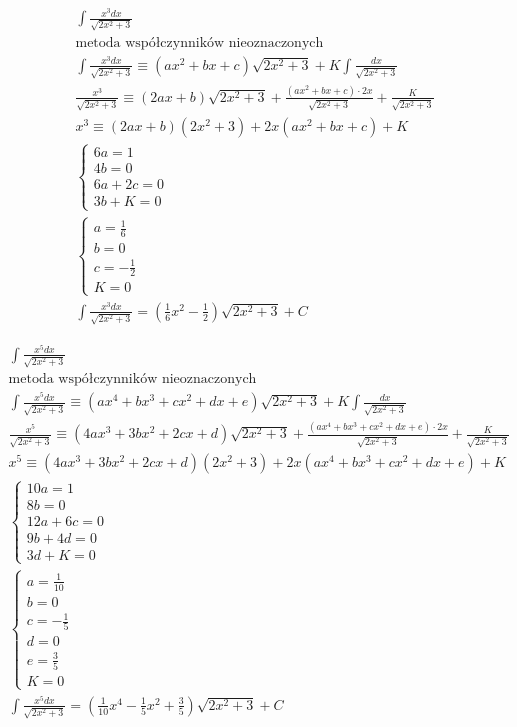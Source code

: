 \begin{gather*}
  \int \frac{x^3dx}{\sqrt{2x^2+3}} \\
  \text{metoda współczynników nieoznaczonych} \\
  \int \frac{x^3dx}{\sqrt{2x^2+3}} \equiv (ax^2+bx+c)\sqrt{2x^2+3} + K\int \frac{dx}{\sqrt{2x^2+3}} \\
\frac{x^3}{\sqrt{2x^2+3}} \equiv (2ax+b)\sqrt{2x^2+3} + \frac{(ax^2+bx+c)\cdot 2x}{\sqrt{2x^2+3}} + \frac{K}{\sqrt{2x^2+3}} \\
x^3 \equiv (2ax+b)(2x^2+3)+2x(ax^2+bx+c)+K \\
\begin{cases} 6a=1 \\ 4b=0 \\ 6a+2c=0 \\ 3b+K=0 \end{cases} \\
\begin{cases} a=\frac{1}{6} \\ b=0 \\ c=-\frac{1}{2} \\ K=0 \end{cases} \\
\int \frac{x^3dx}{\sqrt{2x^2+3}} = (\frac{1}{6}x^2-\frac{1}{2})\sqrt{2x^2+3}+C\end{gather*}



\begin{gather*}
  \int \frac{x^5dx}{\sqrt{2x^2+3}} \\
  \text{metoda współczynników nieoznaczonych} \\
  \int \frac{x^5dx}{\sqrt{2x^2+3}} \equiv (ax^4+bx^3+cx^2+dx+e)\sqrt{2x^2+3}+K\int \frac{dx}{\sqrt{2x^2+3}} \\
\frac{x^5}{\sqrt{2x^2+3}} \equiv (4ax^3+3bx^2+2cx+d)\sqrt{2x^2+3}+\frac{(ax^4+bx^3+cx^2+dx+e)\cdot 2x}{\sqrt{2x^2+3}}+\frac{K}{\sqrt{2x^2+3}} \\
x^5 \equiv (4ax^3+3bx^2+2cx+d)(2x^2+3)+2x(ax^4+bx^3+cx^2+dx+e)+K \\
\begin{cases} 10a=1 \\ 8b=0 \\ 12a+6c=0 \\ 9b+4d=0 \\ 3d+K=0 \end{cases} \\
\begin{cases} a=\frac{1}{10} \\ b=0 \\ c=-\frac{1}{5} \\ d=0 \\ e=\frac{3}{5} \\ K=0 \end{cases} \\
\int \frac{x^5dx}{\sqrt{2x^2+3}} = (\frac{1}{10}x^4-\frac{1}{5}x^2+\frac{3}{5})\sqrt{2x^2+3}+C\end{gather*}


